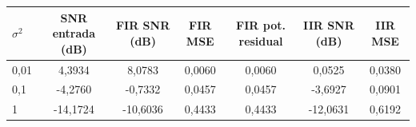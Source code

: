 \begin{tabular}{lcccccc}
\toprule
$\sigma^2$ & SNR entrada (dB) & FIR SNR (dB) & FIR MSE & FIR pot. residual & IIR SNR (dB) & IIR MSE \\
\midrule
0,01 & 4,3934 & 8,0783 & 0,0060 & 0,0060 & 0,0525 & 0,0380 \\
0,1 & -4,2760 & -0,7332 & 0,0457 & 0,0457 & -3,6927 & 0,0901 \\
1 & -14,1724 & -10,6036 & 0,4433 & 0,4433 & -12,0631 & 0,6192 \\
\bottomrule
\end{tabular}